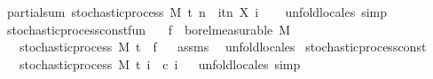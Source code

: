\begin{isabellebody}
\endisatagproof
{\isafoldproof}%
%
\isadelimproof
%
\endisadelimproof
\isanewline
\isanewline
{}\isamarkupfalse%
\ partial{\isacharunderscore}{\kern0pt}sum{\isacharprime}{\kern0pt}{\isacharcolon}{\kern0pt}\ {\isachardoublequoteopen}stochastic{\isacharunderscore}{\kern0pt}process\ M\ t\ {\isacharparenleft}{\kern0pt}{\isasymlambda}n\ {\isasymxi}{\isachardot}{\kern0pt}\ {\isasymSum}i{\isasymin}{\isacharbraceleft}{\kern0pt}tn{\isacharbraceright}{\kern0pt}{\isachardot}{\kern0pt}\ X\ i\ {\isasymxi}{\isacharparenright}{\kern0pt}{\isachardoublequoteclose}%
\isadelimproof
\ %
\endisadelimproof
%
\isatagproof
{}\isamarkupfalse%
\ {\isacharparenleft}{\kern0pt}unfold{\isacharunderscore}{\kern0pt}locales{\isacharparenright}{\kern0pt}\ simp%
\endisatagproof
{\isafoldproof}%
%
\isadelimproof
%
\endisadelimproof
\isanewline
\isanewline
{}\isamarkupfalse%
\isanewline
\isanewline
{}\isamarkupfalse%
\ stochastic{\isacharunderscore}{\kern0pt}process{\isacharunderscore}{\kern0pt}const{\isacharunderscore}{\kern0pt}fun{\isacharcolon}{\kern0pt}\isanewline
\ \ \ {\isachardoublequoteopen}f\ {\isasymin}\ borel{\isacharunderscore}{\kern0pt}measurable\ M{\isachardoublequoteclose}\isanewline
\ \ \ {\isachardoublequoteopen}stochastic{\isacharunderscore}{\kern0pt}process\ M\ t\ {\isacharparenleft}{\kern0pt}{\isasymlambda}{\isacharunderscore}{\kern0pt}{\isachardot}{\kern0pt}\ f{\isacharparenright}{\kern0pt}{\isachardoublequoteclose}%
\isadelimproof
\ %
\endisadelimproof
%
\isatagproof
{}\isamarkupfalse%
\ assms\ \isamarkupfalse%
\ {\isacharparenleft}{\kern0pt}unfold{\isacharunderscore}{\kern0pt}locales{\isacharparenright}{\kern0pt}%
\endisatagproof
{\isafoldproof}%
%
\isadelimproof
%
\endisadelimproof
\isanewline
\isanewline
{}\isamarkupfalse%
\ stochastic{\isacharunderscore}{\kern0pt}process{\isacharunderscore}{\kern0pt}const{\isacharcolon}{\kern0pt}\isanewline
\ \ \ {\isachardoublequoteopen}stochastic{\isacharunderscore}{\kern0pt}process\ M\ t\ {\isacharparenleft}{\kern0pt}{\isasymlambda}i\ {\isacharunderscore}{\kern0pt}{\isachardot}{\kern0pt}\ c\ i{\isacharparenright}{\kern0pt}{\isachardoublequoteclose}%
\isadelimproof
\ %
\endisadelimproof
%
\isatagproof
{}\isamarkupfalse%
\ {\isacharparenleft}{\kern0pt}unfold{\isacharunderscore}{\kern0pt}locales{\isacharparenright}{\kern0pt}\ simp%

\end{isabellebody}
